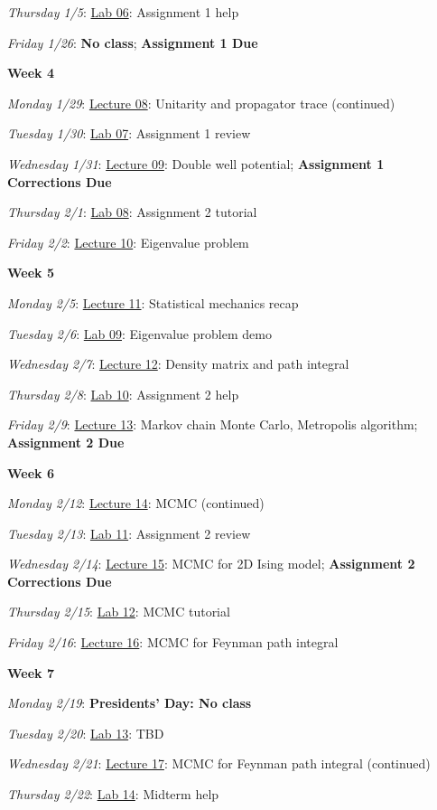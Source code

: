 \documentclass[12pt]{article}
\begin{document}
\emph{Thursday 1/5}: \underline{Lab 06}: Assignment 1 help

\emph{Friday 1/26}: \textbf{No class}; \textbf{Assignment 1 Due}

\noindent\textbf{Week 4}

\emph{Monday 1/29}: \underline{Lecture 08}: Unitarity and propagator trace (continued)

\emph{Tuesday 1/30}: \underline{Lab 07}: Assignment 1 review

\emph{Wednesday 1/31}: \underline{Lecture 09}: Double well potential; \textbf{Assignment 1 Corrections Due}

\emph{Thursday 2/1}: \underline{Lab 08}: Assignment 2 tutorial

\emph{Friday 2/2}: \underline{Lecture 10}: Eigenvalue problem

\noindent\textbf{Week 5}

\emph{Monday 2/5}: \underline{Lecture 11}: Statistical mechanics recap

\emph{Tuesday 2/6}: \underline{Lab 09}: Eigenvalue problem demo

\emph{Wednesday 2/7}: \underline{Lecture 12}: Density matrix and path integral

\emph{Thursday 2/8}: \underline{Lab 10}: Assignment 2 help

\emph{Friday 2/9}: \underline{Lecture 13}: Markov chain Monte Carlo, Metropolis algorithm; \textbf{Assignment 2 Due}

\noindent\textbf{Week 6}

\emph{Monday 2/12}: \underline{Lecture 14}: MCMC (continued)

\emph{Tuesday 2/13}: \underline{Lab 11}: Assignment 2 review

\emph{Wednesday 2/14}: \underline{Lecture 15}: MCMC for 2D Ising model; \textbf{Assignment 2 Corrections Due}

\emph{Thursday 2/15}: \underline{Lab 12}: MCMC tutorial

\emph{Friday 2/16}: \underline{Lecture 16}: MCMC for Feynman path integral

\noindent\textbf{Week 7}

\emph{Monday 2/19}: \textbf{Presidents' Day: No class}

\emph{Tuesday 2/20}: \underline{Lab 13}: TBD

\emph{Wednesday 2/21}: \underline{Lecture 17}: MCMC for Feynman path integral (continued)

\emph{Thursday 2/22}: \underline{Lab 14}: Midterm help
\end{document}
